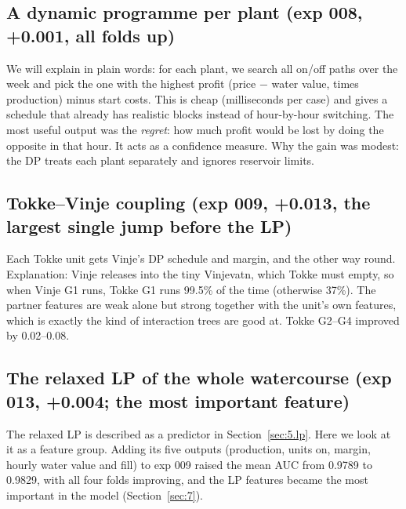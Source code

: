 

\subsection{A dynamic programme per plant (exp 008, +0.001, all folds up)}\label{sec:4.6}

\begin{disposition}
We will explain in plain words: for each plant, we search all on/off paths over the week and pick the one with the highest profit (price − water value, times production) minus start costs. This is cheap (milliseconds per case) and gives a schedule that already has realistic blocks instead of hour-by-hour switching. The most useful output was the \emph{regret}: how much profit would be lost by doing the opposite in that hour. It acts as a confidence measure. Why the gain was modest: the DP treats each plant separately and ignores reservoir limits.
\end{disposition}



\subsection{Tokke–Vinje coupling (exp 009, +0.013, the largest single jump before the LP)}\label{sec:4.7}

\begin{disposition}
Each Tokke unit gets Vinje's DP schedule and margin, and the other way round. Explanation: Vinje releases into the tiny Vinjevatn, which Tokke must empty, so when Vinje G1 runs, Tokke G1 runs 99.5\% of the time (otherwise 37\%). The partner features are weak alone but strong together with the unit's own features, which is exactly the kind of interaction trees are good at. Tokke G2--G4 improved by 0.02--0.08.
\end{disposition}



\subsection{The relaxed LP of the whole watercourse (exp 013, +0.004; the most important feature)}\label{sec:4.8}

The relaxed LP is described as a predictor in Section~\ref{sec:5.lp}. Here we look at it as a feature group. Adding its five outputs (production, units on, margin, hourly water value and fill) to exp 009 raised the mean AUC from 0.9789 to 0.9829, with all four folds improving, and the LP features became the most important in the model (Section~\ref{sec:7}).

